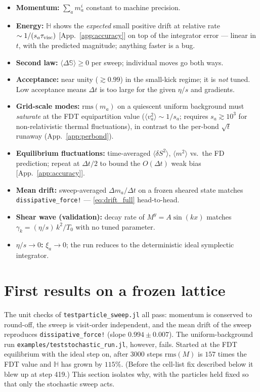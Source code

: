 \documentclass[12pt,aps,preprint,nofootinbib,noshowkeys,noshowpacs,longbibliography,superscriptaddress,tightenlines]{revtex4-2}
\def\Sbb{{\mathbb S}}
\def\app#1{App.~\ref{#1}}
\begin{document}
\begin{itemize}
  \item \textbf{Momentum:} $\sum_a m_a^i$ constant to machine precision.
  \item \textbf{Energy:} $\mathbb H$ shows the \emph{expected} small positive
        drift at relative rate $\sim1/(s_a\tau_{\rm visc})$
        [\app{app:accuracy}] on top of the integrator error --- linear in $t$,
        with the predicted magnitude; anything faster is a bug.
  \item \textbf{Second law:} $\langle\Delta\Sbb\rangle\ge0$ per sweep;
        individual moves go both ways.
  \item \textbf{Acceptance:} near unity ($\gtrsim0.99$) in the small-kick
        regime; it is \emph{not} tuned.  Low acceptance means $\Delta t$ is
        too large for the given $\eta/s$ and gradients.
  \item \textbf{Grid-scale modes:} $\mathrm{rms}(m_a)$ on a quiescent uniform
        background must \emph{saturate} at the FDT equipartition value
        ($\langle v_a^2\rangle\sim1/s_a$; requires $s_a\gtrsim10^3$ for
        non-relativistic thermal fluctuations), in contrast to the per-bond
        $\sqrt t$ runaway (\app{app:perbond}).
  \item \textbf{Equilibrium fluctuations:} time-averaged
        $\langle\delta S^2\rangle$, $\langle m^2\rangle$ vs.\ the FD
        prediction; repeat at $\Delta t/2$ to bound the $O(\Delta t)$ weak
        bias [\app{app:accuracy}].
  \item \textbf{Mean drift:} sweep-averaged $\Delta m_a/\Delta t$ on a frozen
        sheared state matches \texttt{dissipative\_force!} ---
        \eqref{eq:drift_full} head-to-head.
  \item \textbf{Shear wave (validation):} decay rate of $M^y=A\sin(kx)$
        matches $\gamma_k=(\eta/s)\,k^2/T_0$ with no tuned parameter.
  \item \textbf{$\eta/s\to0$:} $\xi_a\to0$; the run reduces to the
        deterministic ideal symplectic integrator.
\end{itemize}

\section{First results on a frozen lattice}
\label{sec:results}

The unit checks of \texttt{testparticle\_sweep.jl} all pass: momentum is conserved
to round-off, the sweep is visit-order independent, and the mean drift of the
sweep reproduces \texttt{dissipative\_force!} (slope $0.994\pm0.007$).  The
uniform-background run \texttt{examples/teststochastic\_run.jl}, however,
fails.  Started at the FDT equilibrium with the ideal step on, after 3000
steps $\mathrm{rms}(M)$ is $157$ times the FDT value and $\mathbb H$ has
grown by $115\%$.  (Before the cell-list fix described below it blew up at
step 419.)  This section isolates why, with the particles held fixed so that
only the stochastic sweep acts.
\end{document}
